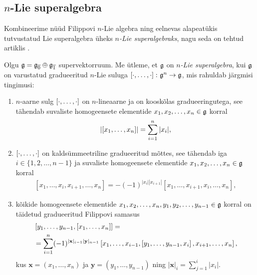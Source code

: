 \subsection{\texorpdfstring{$n$}\ -Lie superalgebra}

Kombineerime nüüd Filippovi $n$-Lie algebra ning eelnevas alapeatükis
tutvustatud Lie superalgebra üheks \emph{$n$-Lie superalgebraks}, nagu
seda on tehtud artiklis \cite{Abramov:2014}.

\begin{dfn}\label{def:n-Lie-superalgebra}
    Olgu $\mathfrak{g} = \mathfrak{g}_{\overline{0}} \oplus \mathfrak{g}_{\overline{1}}$ 
    supervektorruum. Me ütleme, et $\mathfrak{g}$ on
    \emph{$n$-Lie superalgebra}, kui $\mathfrak{g}$ on varustatud
    gradueeritud $n$-Lie suluga $\left[ \cdot, \dots, \cdot \right] \colon \mathfrak{g}^n \to \mathfrak{g}$,
    mis rahuldab järgmisi tingimusi:
    \begin{enumerate}
        \item $n$-aarne sulg $\left[ \cdot, \dots, \cdot \right]$ on $n$-lineaarne ja on
            kooskõlas gradueeringutega, see tähendab suvaliste
            homogeensete elementide $x_1, x_2, \dots, x_n \in \mathfrak{g}$ korral
            \begin{align}\label{def:n-lie-superalg-brac-grading}
                \left| \left[ x_1, \dots, x_n \right] \right| = \sum_{i=1}^n |x_i|,
            \end{align}
        \item $\left[ \cdot, \dots, \cdot \right]$ on kaldsümmeetriline gradueeritud mõttes,
            see tähendab iga $i \in \{1, 2, \dots, n-1\}$ ja suvaliste
            homogeensete elementide $x_1, x_2, \dots, x_n \in \mathfrak{g}$ korral
            \begin{align}
                \left[ x_1, \dots, x_i, x_{i+1}, \dots, x_n \right] =
                -(-1)^{|x_i| |x_{i+1}|} \left[
                    x_1, \dots, x_{i+1}, x_i, \dots, x_n
                \right],
            \end{align}
        \item kõikide homogeensete elementide
            $x_1, x_2, \dots, x_n, y_1, y_2, \dots, y_{n-1} \in \mathfrak{g}$ korral
            on täidetud gradueeritud Filippovi samasus
            \begin{align}\begin{split}
                &\left[ y_1, \dots, y_{n-1}, \left[ x_1, \dots, x_n \right] \right] = \\
                &= \sum_{i=1}^n (-1)^{|\mathbf{x}|_{i-1} |\mathbf{y}|_{n-1}}
                \left[
                    x_1, \dots, x_{i-1},
                    \left[ y_1, \dots, y_{n-1}, x_i \right],
                    x_{i+1}, \dots, x_n
                \right],
            \end{split}\end{align}
            kus $\mathbf{x} = (x_1, \dots, x_n)$ ja
            $\mathbf{y} = (y_1, \dots, y_{n-1})$ ning
            $|\mathbf{x}|_i = \sum_{j=1}^{i} |x_i|$.
    \end{enumerate}
\end{dfn}


